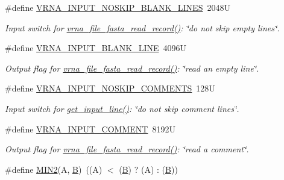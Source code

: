 \begin{DoxyCompactItemize}
\#define \mbox{\hyperlink{group__utils_gab4db885222b3b69608310d7c7e63e286}{V\+R\+N\+A\+\_\+\+I\+N\+P\+U\+T\+\_\+\+N\+O\+S\+K\+I\+P\+\_\+\+B\+L\+A\+N\+K\+\_\+\+L\+I\+N\+ES}}~2048U
\begin{DoxyCompactList}\small\item\em Input switch for \mbox{\hyperlink{group__file__utils_ga8cfb7e271efc9e1f34640acb85475639}{vrna\+\_\+file\+\_\+fasta\+\_\+read\+\_\+record()}}\+: {\itshape \char`\"{}do not skip empty lines\char`\"{}}. \end{DoxyCompactList}\item 
\#define \mbox{\hyperlink{group__utils_ga305474b93ccb79ae4c7754016a8ddd84}{V\+R\+N\+A\+\_\+\+I\+N\+P\+U\+T\+\_\+\+B\+L\+A\+N\+K\+\_\+\+L\+I\+NE}}~4096U
\begin{DoxyCompactList}\small\item\em Output flag for \mbox{\hyperlink{group__file__utils_ga8cfb7e271efc9e1f34640acb85475639}{vrna\+\_\+file\+\_\+fasta\+\_\+read\+\_\+record()}}\+: {\itshape \char`\"{}read an empty line\char`\"{}}. \end{DoxyCompactList}\item 
\#define \mbox{\hyperlink{group__utils_ga0f6311f11bed1842e3a527ab27b294c6}{V\+R\+N\+A\+\_\+\+I\+N\+P\+U\+T\+\_\+\+N\+O\+S\+K\+I\+P\+\_\+\+C\+O\+M\+M\+E\+N\+TS}}~128U
\begin{DoxyCompactList}\small\item\em Input switch for \mbox{\hyperlink{group__utils_ga8ef1835eb83f542396f59f0b205965e5}{get\+\_\+input\+\_\+line()}}\+: {\itshape \char`\"{}do not skip comment lines\char`\"{}}. \end{DoxyCompactList}\item 
\#define \mbox{\hyperlink{group__utils_gaf2062e0eeefffd3ed639af460b3d4fab}{V\+R\+N\+A\+\_\+\+I\+N\+P\+U\+T\+\_\+\+C\+O\+M\+M\+E\+NT}}~8192U
\begin{DoxyCompactList}\small\item\em Output flag for \mbox{\hyperlink{group__file__utils_ga8cfb7e271efc9e1f34640acb85475639}{vrna\+\_\+file\+\_\+fasta\+\_\+read\+\_\+record()}}\+: {\itshape \char`\"{}read a comment\char`\"{}}. \end{DoxyCompactList}\item 
\#define \mbox{\hyperlink{group__utils_gae0b9cd0ce090bd69b951aa73e8fa4f7d}{M\+I\+N2}}(A,  \mbox{\hyperlink{group__energy__parameters__rw_gga7bf2bb363bcf5ce50d60255d256e5682a3f2a77ecd272aa6d6b5902faa5e5fc68}{B}})~((A) $<$ (\mbox{\hyperlink{group__energy__parameters__rw_gga7bf2bb363bcf5ce50d60255d256e5682a3f2a77ecd272aa6d6b5902faa5e5fc68}{B}}) ? (A) \+: (\mbox{\hyperlink{group__energy__parameters__rw_gga7bf2bb363bcf5ce50d60255d256e5682a3f2a77ecd272aa6d6b5902faa5e5fc68}{B}}))

\end{DoxyCompactItemize}
